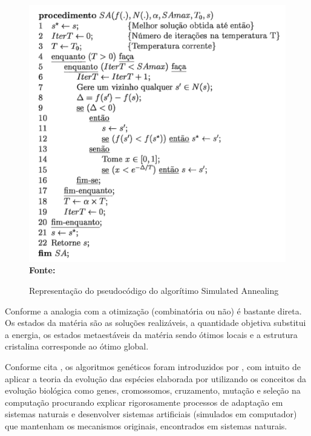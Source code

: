 \begin{figure}[!htb]
\caption[Representação do pseudocódigo do algorítimo Simulated Annealing]{Representação do pseudocódigo do algorítimo Simulated Annealing}
\label{fig:figura2}
\centering
\includegraphics[scale=0.55]{imagens/representacaoSimulatedAnnealing.png}
\\ \textbf{\footnotesize Fonte: \cite{souza2002experiencias}}
\end{figure}

Conforme \cite{aarts1988simulated} a analogia com a otimização (combinatória ou não) é bastante direta. Os estados da matéria são as soluções realizáveis, a quantidade objetiva substitui a energia, os estados metaestáveis da matéria sendo ótimos locais e a estrutura cristalina corresponde ao ótimo global.\par 



Conforme cita \cite{oliveira2005algoritmo}, os algoritmos genéticos foram introduzidos 
por \cite{holland1975adaptation}, com intuito de aplicar a teoria da evolução das espécies 
elaborada por \cite{darwin1968origin} utilizando os conceitos da evolução biológica como 
genes, cromossomos, cruzamento, mutação e seleção na computação procurando explicar rigorosamente processos de adaptação em sistemas naturais e desenvolver sistemas artificiais (simulados em computador) que mantenham os mecanismos originais, encontrados em sistemas naturais.\par

